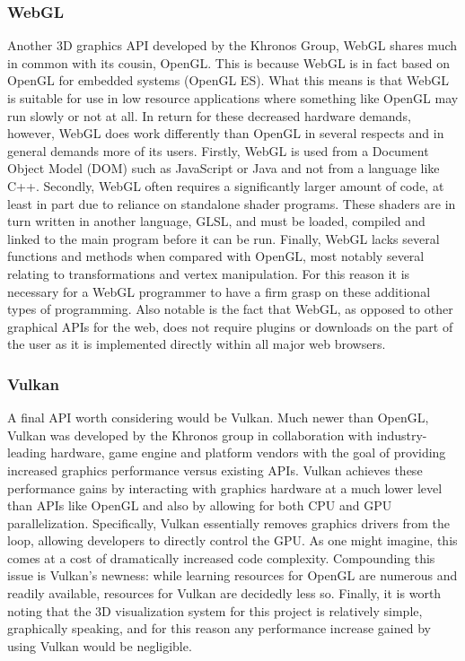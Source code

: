 \documentclass[onecolumn, draftclsnofoot,10pt, compsoc]{IEEEtran}
\begin{document}
	\subsubsection{WebGL}
		Another 3D graphics API developed by the Khronos Group, WebGL shares much in common with its cousin, OpenGL.
		This is because WebGL is in fact based on OpenGL for embedded systems (OpenGL ES).  \cite{webgl1}
		What this means is that WebGL is suitable for use in low resource applications where something like OpenGL may run slowly or not at all.
		In return for these decreased hardware demands, however, WebGL does work differently than OpenGL in several respects and in general demands more of its users.
		Firstly, WebGL is used from a Document Object Model (DOM) such as JavaScript or Java and not from a language like C++. \cite{webgl1}
		Secondly, WebGL often requires a significantly larger amount of code, at least in part due to reliance on standalone shader programs. \cite{webgl1}
		These shaders are in turn written in another language, GLSL, and must be loaded, compiled and linked to the main program before it can be run. 
		Finally, WebGL lacks several functions and methods when compared with OpenGL, most notably several relating to transformations and vertex manipulation. \cite{webgl2}
		For this reason it is necessary for a WebGL programmer to have a firm grasp on these additional types of programming.
		Also notable is the fact that WebGL, as opposed to other graphical APIs for the web, does not require plugins or downloads on the part of the user as it is implemented directly within all major web browsers. \cite{webgl1}

	\subsubsection{Vulkan}
		A final API worth considering would be Vulkan.
		Much newer than OpenGL, Vulkan was developed by the Khronos group in collaboration with industry-leading hardware, game engine and platform vendors with the goal of providing increased graphics performance versus existing APIs. \cite{vulkan1}
		Vulkan achieves these performance gains by interacting with graphics hardware at a much lower level than APIs like OpenGL and also by allowing for both CPU and GPU parallelization.
		Specifically, Vulkan essentially removes graphics drivers from the loop, allowing developers to directly control the GPU. \cite{vulkan1}
		As one might imagine, this comes at a cost of dramatically increased code complexity.
		Compounding this issue is Vulkan's newness: while learning resources for OpenGL are numerous and readily available, resources for Vulkan are decidedly less so.
		Finally, it is worth noting that the 3D visualization system for this project is relatively simple, graphically speaking, and for this reason any performance increase gained by using Vulkan would be negligible. \cite{vulkan1}
	
\end{document}

